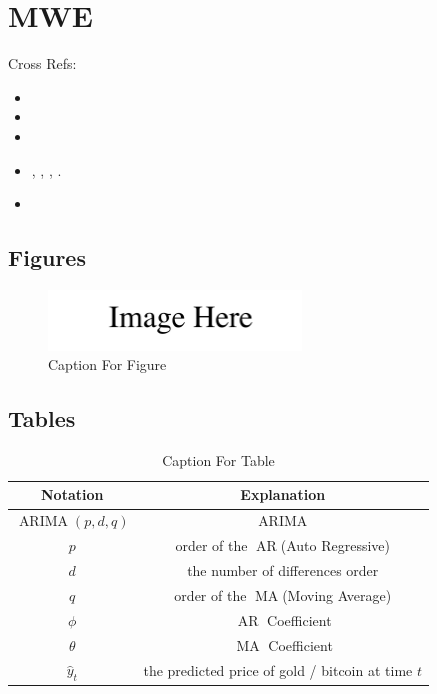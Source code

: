 \clearpage
\section{MWE}

Cross Refs:
\begin{itemize}
	\item {}
	\item {}
	\item {}
	\item {},
	      ,
	      ,
	      .
	\item {}
\end{itemize}

\subsection{Figures}

\begin{figure}[!ht]
	\centering
	\includegraphics[width=0.6\textwidth]{./img/Dummy.pdf}
	\setlength{\abovecaptionskip}{0cm}
	\caption{Caption For Figure}
	\label{fig: Label For Figure}
\end{figure}

\subsection{Tables}

\begin{table}[!ht]
	\centering
	\begin{tabular}{cc}
		\toprule
		Notation                      & Explanation                                       \\
		\midrule
		$\operatorname{ARIMA}(p,d,q)$ & ARIMA                                             \\
		$p$                           & order of the $\operatorname{AR}$(Auto Regressive) \\
		$d$                           & the number of differences order                   \\
		$q$                           & order of the $\operatorname{MA}$(Moving Average)  \\
		$\phi$                        & $\operatorname{AR}$ Coefficient                   \\
		$\theta$                      & $\operatorname{MA}$ Coefficient                   \\
		$\hat{y}_{t}$                 & the predicted price of gold / bitcoin at time $t$ \\
		\bottomrule
	\end{tabular}
	\caption{Caption For Table}
	\label{tab: Label For Table}
\end{table}

